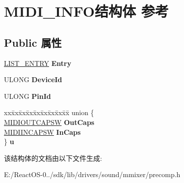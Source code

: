 \hypertarget{struct_m_i_d_i___i_n_f_o}{}\section{M\+I\+D\+I\+\_\+\+I\+N\+F\+O结构体 参考}
\label{struct_m_i_d_i___i_n_f_o}
\subsection*{Public 属性}
\begin{DoxyCompactItemize}
\item 
\mbox{\label{struct_m_i_d_i___i_n_f_o_aa71c05c8865b26609fab4747cd8607d7}} 
\hyperlink{struct___l_i_s_t___e_n_t_r_y}{L\+I\+S\+T\+\_\+\+E\+N\+T\+RY} {\bfseries Entry}
\item 
\mbox{\label{struct_m_i_d_i___i_n_f_o_ac1ae3004937e5636d7f32ab9323312be}} 
U\+L\+O\+NG {\bfseries Device\+Id}
\item 
\mbox{\label{struct_m_i_d_i___i_n_f_o_a3774c78882c45fae1715281c4d828888}} 
U\+L\+O\+NG {\bfseries Pin\+Id}
\item 
\mbox{\label{struct_m_i_d_i___i_n_f_o_a42b1052e396abbcef80d9de1d0926e80}} 
\begin{tabbing}
xx\=xx\=xx\=xx\=xx\=xx\=xx\=xx\=xx\=\kill
union \{\\
\>\hyperlink{structtag_m_i_d_i_o_u_t_c_a_p_s_w}{MIDIOUTCAPSW} {\bfseries OutCaps}\\
\>\hyperlink{structtag_m_i_d_i_i_n_c_a_p_s_w}{MIDIINCAPSW} {\bfseries InCaps}\\
\} {\bfseries u}\\

\end{tabbing}\end{DoxyCompactItemize}


该结构体的文档由以下文件生成\+:\begin{DoxyCompactItemize}
\item 
E\+:/\+React\+O\+S-\/0../sdk/lib/drivers/sound/mmixer/precomp.\+h\end{DoxyCompactItemize}
